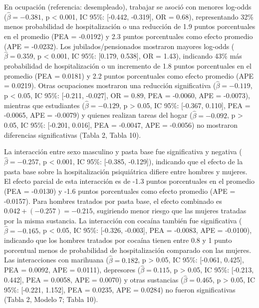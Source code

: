 \documentclass[
  spanish,
  10pt,
]{article}
\begin{document}
En ocupación (referencia: desempleado), trabajar se asoció con menores
log-odds (\(\hat{\beta} = -0.381\), p \textless{} 0.001, IC 95\%:
{[}-0.442, -0.319{]}, OR = 0.68), representando 32\% menos probabilidad
de hospitalización o una reducción de 1.9 puntos porcentuales en el
promedio (PEA = -0.0192) y 2.3 puntos porcentuales como efecto promedio
(APE = -0.0232). Los jubilados/pensionados mostraron mayores log-odds
(\(\hat{\beta} = 0.359\), p \textless{} 0.001, IC 95\%: {[}0.179,
0.538{]}, OR = 1.43), indicando 43\% más probabilidad de hospitalización
o un incremento de 1.8 puntos porcentuales en el promedio (PEA = 0.0181)
y 2.2 puntos porcentuales como efecto promedio (APE = 0.0219). Otras
ocupaciones mostraron una reducción significativa
(\(\hat{\beta} = -0.119\), p \textless{} 0.05, IC 95\%: {[}-0.211,
-0.027{]}, OR = 0.89, PEA = -0.0060, APE = -0.0073), mientras que
estudiantes (\(\hat{\beta} = -0.129\), p \textgreater{} 0.05, IC 95\%:
{[}-0.367, 0.110{]}, PEA = -0.0065, APE = -0.0079) y quienes realizan
tareas del hogar (\(\hat{\beta} = -0.092\), p \textgreater{} 0.05, IC
95\%: {[}-0.201, 0.016{]}, PEA = -0.0047, APE = -0.0056) no mostraron
diferencias significativas (Tabla 2, Tabla 10).

La interacción entre sexo masculino y pasta base fue significativa y
negativa (\(\hat{\beta} = -0.257\), p \textless{} 0.001, IC 95\%:
{[}-0.385, -0.129{]}), indicando que el efecto de la pasta base sobre la
hospitalización psiquiátrica difiere entre hombres y mujeres. El efecto
parcial de esta interacción es de -1.3 puntos porcentuales en el
promedio (PEA = -0.0130) y -1.6 puntos porcentuales como efecto promedio
(APE = -0.0157). Para hombres tratados por pasta base, el efecto
combinado es \(0.042 + (-0.257) = -0.215\), sugiriendo menor riesgo que
las mujeres tratadas por la misma sustancia. La interacción con cocaína
también fue significativa (\(\hat{\beta} = -0.165\), p \textless{} 0.05,
IC 95\%: {[}-0.326, -0.003{]}, PEA = -0.0083, APE = -0.0100), indicando
que los hombres tratados por cocaína tienen entre 0.8 y 1 punto
porcentual menos de probabilidad de hospitalización comparado con las
mujeres. Las interacciones con marihuana (\(\hat{\beta} = 0.182\), p
\textgreater{} 0.05, IC 95\%: {[}-0.061, 0.425{]}, PEA = 0.0092, APE =
0.0111), depresores (\(\hat{\beta} = 0.115\), p \textgreater{} 0.05, IC
95\%: {[}-0.213, 0.442{]}, PEA = 0.0058, APE = 0.0070) y otras
sustancias (\(\hat{\beta} = 0.465\), p \textgreater{} 0.05, IC 95\%:
{[}-0.221, 1.152{]}, PEA = 0.0235, APE = 0.0284) no fueron
significativas (Tabla 2, Modelo 7; Tabla 10).
\end{document}
